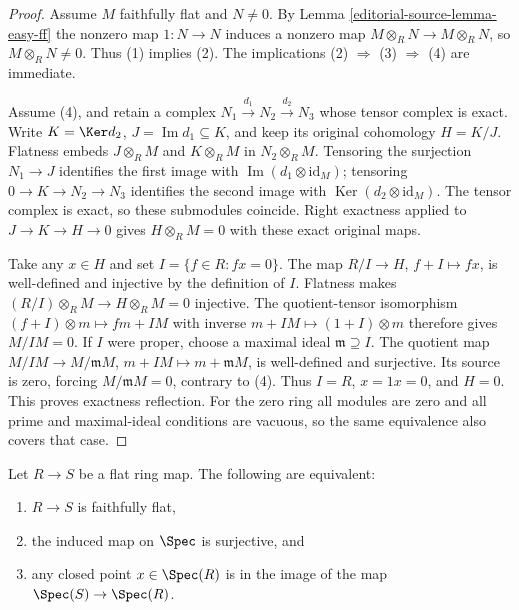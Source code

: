 \begin{proof}
Assume $M$ faithfully flat and $N \not = 0$. By Lemma \ref{editorial-source-lemma-easy-ff}
the nonzero map $1 : N \to N$ induces a nonzero map
$M \otimes_R N \to M \otimes_R N$, so $M \otimes_R N \not = 0$.
Thus (1) implies (2). The implications (2) $\Rightarrow$ (3) $\Rightarrow$ (4)
are immediate.

\medskip\noindent
Assume (4), and retain a complex
$N_1\xrightarrow{d_1}N_2\xrightarrow{d_2}N_3$ whose
tensor complex is exact. Write
$K=\Ker d_2$, $J=\operatorname{Im}d_1\subseteq K$,
and keep its original cohomology $H=K/J$.
Flatness embeds $J\otimes_R M$ and $K\otimes_R M$ in
$N_2\otimes_R M$. Tensoring the surjection $N_1\to J$
identifies the first image with
$\operatorname{Im}(d_1\otimes\mathrm{id}_M)$; tensoring
$0\to K\to N_2\to N_3$ identifies the second image with
$\operatorname{Ker}(d_2\otimes\mathrm{id}_M)$.
The tensor complex is exact, so these submodules coincide.
Right exactness applied to $J\to K\to H\to0$ gives
$H\otimes_R M=0$ with these exact original maps.

Take any $x\in H$ and set $I=\{f\in R:fx=0\}$.
The map $R/I\to H$, $f+I\mapsto fx$, is well-defined
and injective by the definition of $I$.
Flatness makes $(R/I)\otimes_R M\to H\otimes_R M=0$
injective. The quotient-tensor isomorphism
$(f+I)\otimes m\mapsto fm+IM$ with inverse
$m+IM\mapsto(1+I)\otimes m$ therefore gives $M/IM=0$.
If $I$ were proper, choose a maximal ideal
$\mathfrak m\supseteq I$. The quotient map
$M/IM\to M/\mathfrak mM$, $m+IM\mapsto m+\mathfrak mM$,
is well-defined and surjective. Its source is zero, forcing
$M/\mathfrak mM=0$, contrary to (4). Thus $I=R$,
$x=1x=0$, and $H=0$. This proves exactness reflection.
For the zero ring all modules are zero and all prime and
maximal-ideal conditions are vacuous, so the same equivalence
also covers that case.
\end{proof}

\begin{lemma}
\label{editorial-source-lemma-ff-rings}
Let $R \to S$ be a flat ring map.
The following are equivalent:
\begin{enumerate}
\item $R \to S$ is faithfully flat,
\item the induced map on $\Spec$ is surjective, and
\item any closed point $x \in \Spec(R)$ is
in the image of the map $\Spec(S) \to \Spec(R)$.
\end{enumerate}
\end{lemma}

